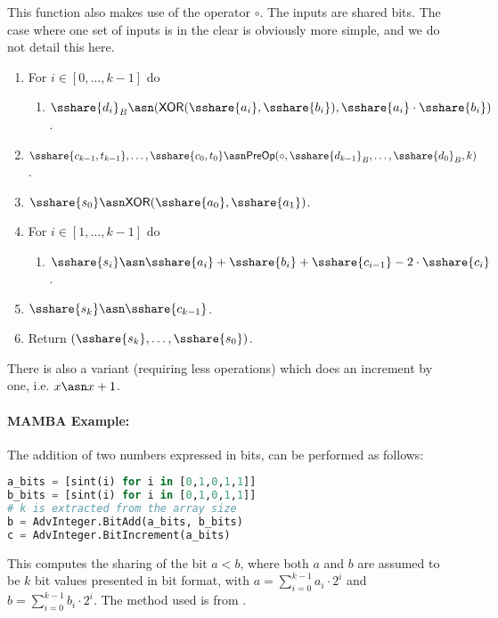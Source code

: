   This function also makes use of the operator $\circ$.
  The inputs are shared bits. The case where one set of inputs is in the clear
  is obviously more simple, and we do not detail this here.
  \begin{enumerate}
    \item For $i \in [0,\ldots,k-1]$ do
          \begin{enumerate}
            \item $\sshare{d_i}_B \asn (\mathsf{XOR}(\sshare{a_i}, \sshare{b_i}),
                    \sshare{a_i}\cdot \sshare{b_i})$.
          \end{enumerate}
    \item $\sshare{c_{k-1},t_{k-1}},\ldots,\sshare{c_0,t_0}  \asn \mathsf{PreOp}(\circ,\sshare{d_{k-1}}_B,\ldots,\sshare{d_0}_B,k)$.
    \item $\sshare{s_0} \asn \mathsf{XOR}(\sshare{a_0}, \sshare{a_1})$.
    \item For $i \in [1,\ldots,k-1]$ do
          \begin{enumerate}
            \item $\sshare{s_i} \asn \sshare{a_i}+\sshare{b_i}+\sshare{c_{i-1}}-2\cdot \sshare{c_i}$.
          \end{enumerate}
    \item $\sshare{s_k} \asn \sshare{c_{k-1}}$.
    \item Return $(\sshare{s_k},\ldots,\sshare{s_0})$.
  \end{enumerate}
  There is also a variant (requiring less operations) which does an increment
  by one, i.e. $x \asn x+1$.

  \paragraph{MAMBA Example:} The addition of two numbers expressed in bits, can be performed as follows:
  \begin{lstlisting}[language={python}]
a_bits = [sint(i) for i in [0,1,0,1,1]]
b_bits = [sint(i) for i in [0,1,0,1,1]]
# k is extracted from the array size
b = AdvInteger.BitAdd(a_bits, b_bits)
c = AdvInteger.BitIncrement(a_bits)
\end{lstlisting}

  This computes the sharing of the bit $a<b$, where both $a$ and $b$ are
  assumed to be $k$ bit values presented in bit format, with
$a=\sum_{i=0}^{k-1} a_i \cdot 2^i$ and
$b=\sum_{i=0}^{k-1} b_i \cdot 2^i$.
  The method used is from \cite{DFKNT06}.
